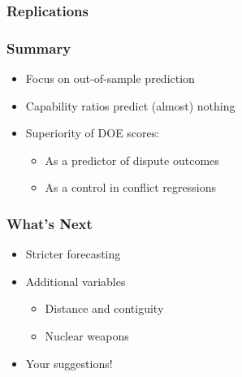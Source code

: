 \documentclass{beamer}
\begin{document}
\begin{frame}
  \frametitle{Replications}

  
\end{frame}

\begin{frame}
  \frametitle{Summary}

  \begin{itemize}
    \item Focus on out-of-sample prediction
    \item Capability ratios predict (almost) nothing
    \item Superiority of DOE scores:
    \begin{itemize}
      \item As a predictor of dispute outcomes
      \item As a control in conflict regressions
    \end{itemize}
  \end{itemize}
\end{frame}

\begin{frame}
  \frametitle{What's Next}

  \begin{itemize}
    \item Stricter forecasting
    \item Additional variables
    \begin{itemize}
      \item Distance and contiguity
      \item Nuclear weapons
    \end{itemize}
    \item Your suggestions!
  \end{itemize}
\end{frame}

\end{document}
